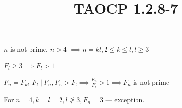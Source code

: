 \documentclass{article}
\title{TAOCP 1.2.8\mbox{-}7}
\begin{document}
\maketitle

\( n \) is not prime, \( n > 4 \) \( \implies n = kl, 2 \leq k \leq l, l \geq 3 \)

\( F_{l} \geq 3 \implies F_{l} > 1 \)

\( F_{n} = F_{kl}, F_{l} \mid F_{n}, F_{n} > F_{l} \implies \frac{F_{n}}{F_{l}} > 1 \implies F_{n} \) is not prime

For \( n = 4, k=l=2, l \not \geq 3, F_{n} = 3 \) --- exception.
\end{document}
